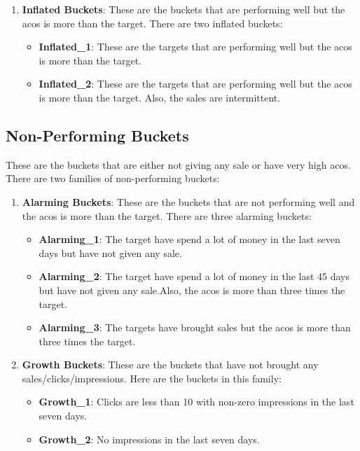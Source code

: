 \begin{enumerate}
\begin{itemize}
          \end{itemize}
    \item \textbf{Inflated Buckets}: These are the buckets that are performing well but the acos is more than the target. There are two inflated buckets:
          \begin{itemize}
              \item \textbf{Inflated\_1}: These are the targets that are performing well but the acos is more than the target.
              \item \textbf{Inflated\_2}: These are the targets that are performing well but the acos is more than the target. Also, the sales are intermittent.
          \end{itemize}
\end{enumerate}

\subsection{Non-Performing Buckets}

These are the buckets that are either not giving any sale or have very high acos. There are two families of non-performing buckets:

\begin{enumerate}
    \item \textbf{Alarming Buckets}: These are the buckets that are not performing well and the acos is more than the target. There are three alarming buckets:
          \begin{itemize}
              \item \textbf{Alarming\_1}: The target have spend a lot of money in the last seven days but have not given any sale.
              \item \textbf{Alarming\_2}: The target have spend a lot of money in the last 45 days but have not given any sale.Also, the acos is more than three times the target.
              \item \textbf{Alarming\_3}: The targets have brought sales but the acos is more than three times the target.
          \end{itemize}
    \item \textbf{Growth Buckets}: These are the buckets that have not brought any sales/clicks/impressions. Here are the buckets in this family:
          \begin{itemize}
              \item \textbf{Growth\_1}: Clicks are less than 10 with non-zero impressions in the last seven days.
              \item \textbf{Growth\_2}: No impressions in the last seven days.
          \end{itemize}
\end{enumerate}

